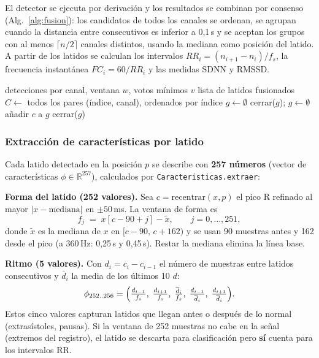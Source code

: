 El detector se ejecuta por derivación y los resultados se combinan por consenso (Alg.~\ref{alg:fusion}): los candidatos de todos los canales se ordenan, se agrupan cuando la distancia entre consecutivos es inferior a 0,1\,s y se aceptan los grupos con al menos $\lceil n/2\rceil$ canales distintos, usando la mediana como posición del latido. A partir de los latidos se calculan los intervalos $RR_i=(n_{i+1}-n_i)/f_s$, la frecuencia instantánea $FC_i=60/RR_i$ y las medidas SDNN y RMSSD.

\begin{algorithm}[H]
\small
\caption{Fusión de detecciones por consenso}
\label{alg:fusion}
\begin{algorithmic}[1]
\Require detecciones por canal, ventana $w$, votos mínimos $v$
\Ensure lista de latidos fusionados
\State $C\leftarrow$ todos los pares (índice, canal), ordenados por índice
\State $g\leftarrow\emptyset$
    \State cerrar($g$); $g\leftarrow\emptyset$
  \EndIf
  \State añadir $c$ a $g$
\EndFor
\State cerrar($g$) 
\end{algorithmic}
\end{algorithm}

\subsubsection{Extracción de características por latido}

Cada latido detectado en la posición $p$ se describe con \textbf{257 números} (vector de características $\phi\in\mathbb{R}^{257}$), calculados por \texttt{Caracteristicas.extraer}:

\textbf{Forma del latido (252 valores).} Sea $c=\mathrm{recentrar}(x,p)$ el pico R refinado al mayor $|x-\mathrm{mediana}|$ en $\pm 50$\,ms. La ventana de forma es
\begin{equation}
f_j \;=\; x[c-90+j]-\tilde{x},\qquad j=0,\dots,251,
\end{equation}
donde $\tilde{x}$ es la mediana de $x$ en $[c-90,\,c+162)$ y se usan 90 muestras antes y 162 desde el pico (a 360\,Hz: 0,25\,s y 0,45\,s). Restar la mediana elimina la línea base.

\textbf{Ritmo (5 valores).} Con $d_i=c_i-c_{i-1}$ el número de muestras entre latidos consecutivos y $\overline{d}_i$ la media de los últimos 10 $d$:
\begin{equation}
\phi_{252..256}=\Bigl(\tfrac{d_{i-1}}{f_s},\;\tfrac{d_{i+1}}{f_s},\;\tfrac{\overline{d}_i}{f_s},\;\tfrac{d_{i-1}}{\overline{d}_i},\;\tfrac{d_{i+1}}{\overline{d}_i}\Bigr).
\end{equation}
Estos cinco valores capturan latidos que llegan antes o después de lo normal (extrasístoles, pausas). Si la ventana de 252 muestras no cabe en la señal (extremos del registro), el latido se descarta para clasificación pero \textbf{sí} cuenta para los intervalos RR.

